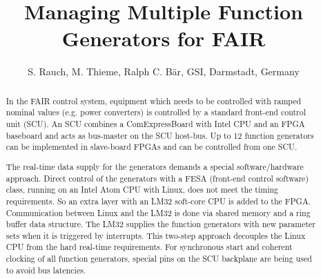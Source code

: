 \documentclass[a4paper,
              ]{jacow}
\begin{document}
\title{Managing Multiple Function Generators for FAIR}

\author{S. Rauch, M. Thieme, Ralph C. Bär, GSI,  Darmstadt, Germany}

\maketitle

%
\begin{abstract}
In the FAIR control system, equipment which needs to be controlled with ramped nominal values (e.g. power converters) is controlled by a standard front-end control unit (SCU). An SCU combines a ComExpressBoard with Intel CPU and an FPGA baseboard and acts as bus-master on the SCU host-bus. Up to 12 function generators can be implemented in slave-board FPGAs and can be controlled from one SCU.

The real-time data supply for the generators demands a special software/hardware approach. Direct control of the generators with a FESA (front-end control software) class, running on an Intel Atom CPU with Linux, does not meet the timing requirements. So an extra layer with an LM32 soft-core CPU is added to the FPGA. Communication between Linux and the LM32 is done via shared memory and a ring buffer data structure. The LM32 supplies the function generators with new parameter sets when it is triggered by interrupts. This two-step approach decouples the Linux CPU from the hard real-time requirements. For synchronous start and coherent clocking of all function generators, special pins on the SCU backplane are being used to avoid bus latencies.\end{abstract}
\end{document}
